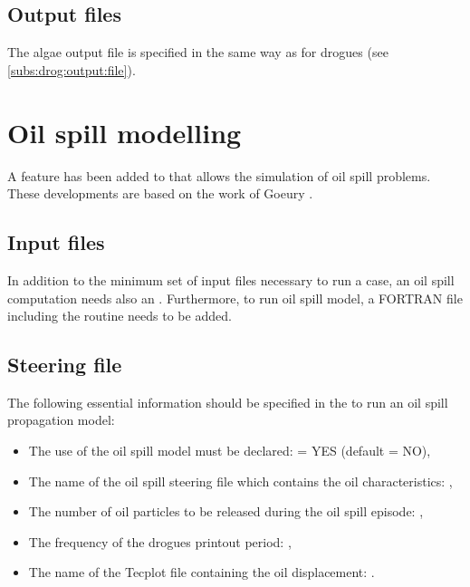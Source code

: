 \subsection{Output files}

The algae output file is specified in the same way as for drogues
(see \ref{subs:drog:output:file}).


\section{Oil spill modelling}
\label{sec:oil:spill:modell}
A feature has been added to  that allows the simulation
of oil spill problems.
These developments are based on the work of Goeury \cite{goeury2012}.


\subsection{Input files}

In addition to the minimum set of input files necessary to run a 
case, an oil spill computation needs also an .
Furthermore, to run oil spill model, a FORTRAN file including the routine
 needs to be added.


\subsection{Steering file}

The following essential information should be specified in the 
 to run an oil spill propagation model:

\begin{itemize}
\item The use of the oil spill model must be declared:
 = YES (default = NO),

\item The name of the oil spill steering file which contains the oil
characteristics: ,

\item The number of oil particles to be released during the oil spill episode:
\newline {},

\item The frequency of the drogues printout period:
,

\item The name of the Tecplot file containing the oil displacement:
.
\end{itemize}

